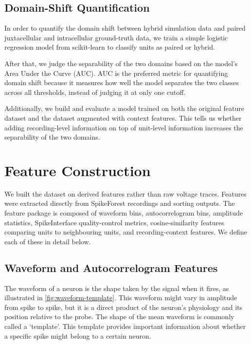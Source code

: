 \subsection{Domain-Shift Quantification}

In order to quantify the domain shift between hybrid simulation data and paired juxtacellular and intracellular ground-truth data, we train a simple logistic regression model \parencite{10.1111/j.2517-6161.1958.tb00292.x} from scikit-learn to classify units as paired or hybrid.

After that, we judge the separability of the two domains based on the model's Area Under the Curve (AUC). AUC is the preferred metric for quantifying domain shift because it measures how well the model separates the two classes across all thresholds, instead of judging it at only one cutoff.

Additionally, we build and evaluate a model trained on both the original feature dataset and the dataset augmented with context features. This tells us whether adding recording-level information on top of unit-level information increases the separability of the two domains.

\section{Feature Construction}

We built the dataset on derived features rather than raw voltage traces. Features were extracted directly from SpikeForest recordings and sorting outputs. The feature package is composed of waveform bins, autocorrelogram bins, amplitude statistics, SpikeInterface quality-control metrics, cosine-similarity features comparing units to neighbouring units, and recording-context features. We define each of these in detail below.

\subsection{Waveform and Autocorrelogram Features}

The waveform of a neuron is the shape taken by the signal when it fires, as illustrated in \cref{fig:waveform-template}. This waveform might vary in amplitude from spike to spike, but it is a direct product of the neuron’s physiology and its position relative to the probe. The shape of the mean waveform is commonly called a ‘template’. This template provides important information about whether a specific spike might belong to a certain neuron.

